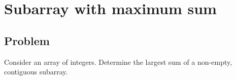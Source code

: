 
\section{Subarray with maximum sum}



\subsection*{Problem}

Consider an array of integers.  Determine the largest sum of a
non-empty, contiguous subarray.
